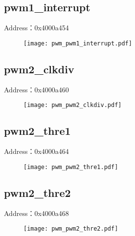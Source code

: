 \subsection{pwm1\_interrupt}
\label{pwm-pwm1-interrupt}
Address：0x4000a454
 \begin{figure}[H]
\texttt{[image: pwm\_pwm1\_interrupt.pdf]}
\end{figure}

\subsection{pwm2\_clkdiv}
\label{pwm-pwm2-clkdiv}
Address：0x4000a460
 \begin{figure}[H]
\texttt{[image: pwm\_pwm2\_clkdiv.pdf]}
\end{figure}

\subsection{pwm2\_thre1}
\label{pwm-pwm2-thre1}
Address：0x4000a464
 \begin{figure}[H]
\texttt{[image: pwm\_pwm2\_thre1.pdf]}
\end{figure}

\subsection{pwm2\_thre2}
\label{pwm-pwm2-thre2}
Address：0x4000a468
 \begin{figure}[H]
\texttt{[image: pwm\_pwm2\_thre2.pdf]}
\end{figure}

